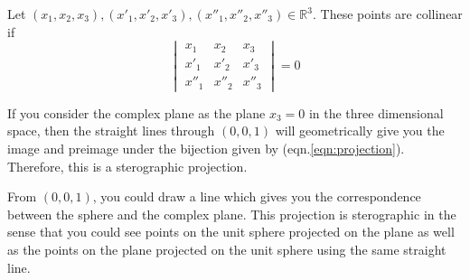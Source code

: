 \begin{commentary}
\begin{definition}[collinear]
	Let $(x_1,x_2,x_3), (x'_1,x'_2,x'_3), (x''_1,x''_2,x''_3) \in \mathbb{R}^3$.
	These points are collinear if
	\[ \begin{vmatrix} x_1 & x_2 & x_3 \\ x'_1 & x'_2 & x'_3 \\ x''_1 & x''_2 & x''_3 \end{vmatrix} = 0\]
\end{definition}
\end{commentary}

If you consider the complex plane as the plane $x_3 = 0$ in the three dimensional space, then the straight lines through $(0,0,1)$ will geometrically give you the image and preimage under the bijection given by (eqn.\ref{eqn:projection}).
Therefore, this is a sterographic projection.\\

\begin{commentary}
	From $(0,0,1)$, you could draw a line which gives you the correspondence between the sphere and the complex plane.
	This projection is sterographic in the sense that you could see points on the unit sphere projected on the plane as well as the points on the plane projected on the unit sphere using the same straight line.
\end{commentary}

